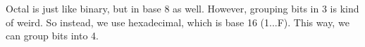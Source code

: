 
Octal is just like binary, but in base 8 as well. However, grouping bits in 3 is kind of weird. So instead, we use hexadecimal, which is base 16 (1...F). This way, we can group bits into 4.
